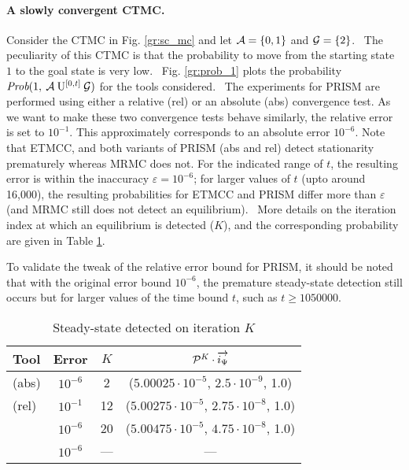 \documentclass[times, 10pt,twocolumn]{article}
\begin{document}
	\paragraph{A slowly convergent CTMC. \label{ss:slow_conv}}
		Consider the CTMC in Fig. \ref{gr:sc_mc} and let $\mathcal{A} = \{0,1\}$ and $\mathcal{G} = \{2\}$.  The peculiarity of this CTMC is that the probability to move from the starting state $1$ to the goal state is very low.  Fig. \ref{gr:prob_1} plots the probability $\mbox{\it Prob}(1, \: \mathcal{A} \: \mathrm{U}^{[0,t]} \: \mathcal{G} )$ for the tools considered.  The experiments for PRISM are performed using either a relative (rel) or an absolute (abs) convergence test. As we want to make these two convergence tests behave similarly, the relative error is set to $10^{-1}$. This approximately corresponds to an absolute error $10^{-6}$. Note that ETMCC, and both variants of PRISM (abs and rel) detect stationarity prematurely whereas MRMC does not. For the indicated range of $t$, the resulting error is within the inaccuracy $\varepsilon = 10^{{-}6}$; for larger values of $t$ (upto around 16,000), the resulting probabilities for ETMCC and PRISM differ more than $\varepsilon$ (and MRMC still does not detect an equilibrium).  More details on the iteration index at which an equilibrium is detected ($K$), and the corresponding probability are given in Table \ref{tb:ssd_points}.
		
		To validate the tweak of the relative error bound for PRISM, it should be noted that with the original error bound $10^{-6}$, the premature steady-state detection still occurs but for larger values of the time bound $t$, such as $t \geq 1050000$.
		
	\begin{table}[h]
	{\footnotesize
		\caption{Steady-state detected on iteration $K$}
		\begin{center}
			\begin{tabular}{|l|c|c|c|}
				\hline
				Tool 		& Error &	$K$	& $\mathcal{P}^{K} \cdot \overrightarrow{i_{\Psi}}$ \\
				\hline
				\prism (abs)	& $10^{-6}$ &	 2	&	($5.00025 \cdot 10^{-5}$, $2.5 \cdot 10^{-9}$, 1.0) \\
				\prism (rel)	& $10^{-1}$ &	12	&	($5.00275 \cdot 10^{-5}$, $2.75 \cdot 10^{-8}$, 1.0) \\
				\etmcc		& $10^{-6}$ &	20	&	($5.00475 \cdot 10^{-5}$, $4.75 \cdot 10^{-8}$, 1.0) \\
				\mrmc		& $10^{-6}$ & ---	&	---	 \\
				\hline
			\end{tabular}
		\end{center}
		\label{tb:ssd_points}
		\vspace{-0.7cm}
	}
	\end{table}
	
\end{document}
